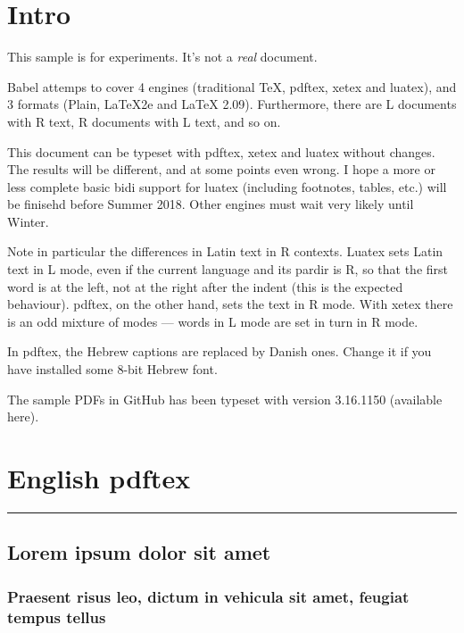\documentclass[a4paper]{book}
\newcommand\engine{pdftex}
\newcommand\engine{luatex}
\newcommand\engine{xetex}
\begin{document}
\tableofcontents

\listoffigures


\chapter{Intro}

This sample is for experiments. It's not a \textit{real} document.

Babel attemps to cover 4 engines (traditional \TeX, pdftex, xetex
and luatex), and 3 formats (Plain, \LaTeX 2e and \LaTeX
2.09). Furthermore, there are L documents with R text, R documents
with L text, and so on.

This document can be typeset with pdftex, xetex and luatex without
changes. The results will be different, and at some points even
wrong. I hope a more or less complete basic bidi support for luatex
(including footnotes, tables, etc.) will be finisehd before Summer
2018. Other engines must wait very likely until Winter.

Note in particular the differences in Latin text in R contexts. Luatex
sets Latin text in L mode, even if the current language and its pardir
is R, so that the first word is at the left, not at the right after the
indent (this is the expected behaviour). pdftex, on the other hand,
sets the text in R mode. With xetex there is an odd mixture of modes —
words in L mode are set in turn in R mode.

In pdftex, the Hebrew captions are replaced by Danish ones. Change it
if you have installed some 8-bit Hebrew font.

The sample PDFs in GitHub has been typeset with version 3.16.1150
(available here).

\chapter{English \engine}

\setcounter{section}{25}
\setcounter{table}{34}
\setcounter{page}{56}

\bigskip
\hrule
\bigskip

\section{Lorem ipsum dolor sit amet}
\label{bla}

\subsection{Praesent risus leo, dictum in vehicula sit amet, feugiat
tempus tellus}
\end{document}
